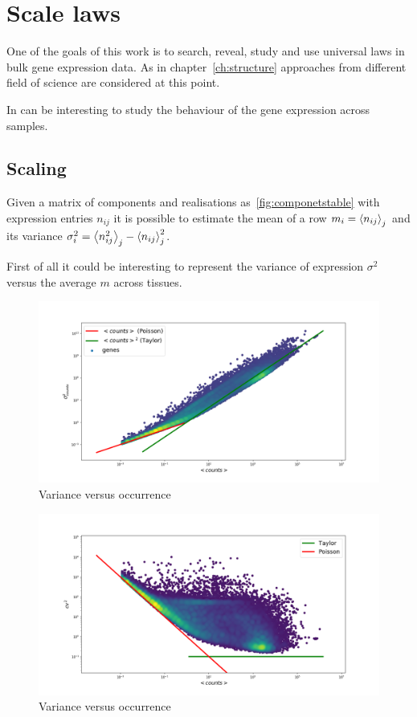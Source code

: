 \chapter{Scale laws}\label{ch:scalelaws}
One of the goals of this work is to search, reveal, study and use universal laws in bulk gene expression data.\nocite{altmann2016statistical}
As in chapter~\ref{ch:structure} approaches from different field of science are considered at this point.

In can be interesting to study the behaviour of the gene expression across samples.

\section{Scaling}

Given a matrix of components and realisations as~\ref{fig:componetstable} with expression entries $n_{i j}$ it is possible to estimate the mean of a row $m_i=\left\langle n_{ij}\right\rangle_j$ and its variance $\sigma^2_i=\left\langle n_{ij}^2\right\rangle_j - \left\langle n_{ij}\right\rangle^2_j$.

First of all it could be interesting to represent the variance of expression $\sigma^2$ versus 
the average $m$ across tissues.

\begin{figure}[htb!]
    \centering
    \includegraphics[width=0.9\linewidth]{pictures/scalelaws/gtex/allgenes/varmean_loglog.png}
    \caption{Variance versus occurrence}
    \label{fig:scalelaws/gtex/allgenes/varmean_loglog_density}
\end{figure}

\begin{figure}[htb!]
    \centering
    \includegraphics[width=0.9\linewidth]{pictures/scalelaws/gtex/allgenes/cvmean_loglog.png}
    \caption{Variance versus occurrence}
    \label{fig:scalelaws/gtex/allgenes/cvmean_loglog}
\end{figure}

